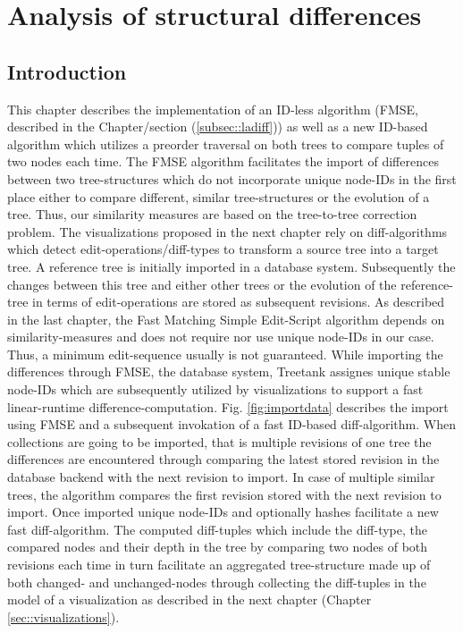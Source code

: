\section{Analysis of structural differences}\label{sec::differences}
\subsection{Introduction}
This chapter describes the implementation of an ID-less algorithm (FMSE, described in the Chapter/section (\ref{subsec::ladiff})) as well as a new ID-based algorithm which utilizes a preorder traversal on both trees to compare tuples of two nodes each time. The FMSE algorithm facilitates the import of differences between two tree-structures which do not incorporate unique node-IDs in the first place either to compare different, similar tree-structures or the evolution of a tree. Thus, our similarity measures are based on the tree-to-tree correction problem. The visualizations proposed in the next chapter rely on diff-algorithms which detect edit-operations/diff-types to transform a source tree into a target tree. A reference tree is initially imported in a database system. Subsequently the changes between this tree and either other trees or the evolution of the reference-tree in terms of edit-operations are stored as subsequent revisions. As described in the last chapter, the Fast Matching Simple Edit-Script algorithm depends on similarity-measures and does not require nor use unique node-IDs in our case. Thus, a minimum edit-sequence usually is not guaranteed. While importing the differences through FMSE, the database system, Treetank assignes unique stable node-IDs which are subsequently utilized by visualizations to support a fast linear-runtime difference-computation. Fig. \ref{fig:importdata} describes the import using FMSE and a subsequent invokation of a fast ID-based diff-algorithm. When collections are going to be imported, that is multiple revisions of one tree the differences are encountered through comparing the latest stored revision in the database backend with the next revision to import. In case of multiple similar trees, the algorithm compares the first revision stored with the next revision to import. Once imported unique node-IDs and optionally hashes facilitate a new fast diff-algorithm. The computed diff-tuples which include the diff-type, the compared nodes and their depth in the tree by comparing two nodes of both revisions each time in turn facilitate an aggregated tree-structure made up of both changed- and unchanged-nodes through collecting the diff-tuples in the model of a visualization as described in the next chapter (Chapter \ref{sec::visualizations}). 

